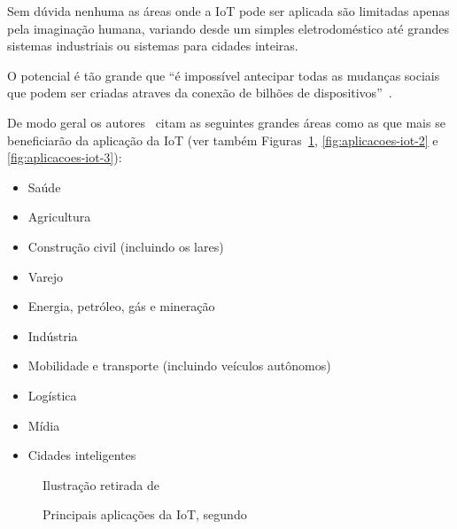 \documentclass[pdftex, brazil, 12pt, twoside]{article}
\begin{document}
Sem dúvida nenhuma as áreas onde a IoT pode ser aplicada são limitadas apenas
pela imaginação humana, variando desde um simples eletrodoméstico até grandes
sistemas industriais ou sistemas para cidades inteiras.

O potencial é tão grande que ``é impossível antecipar
todas as mudanças sociais que podem ser criadas atraves da conexão de bilhões
de dispositivos''~\citep{UKGOSWalportIoT2014}.

De modo geral os autores~\citep{OliverWymanIoT2015,UKGOSWalportIoT2014,IEEEIoTReport,IEEEIoTDefinition,ChuiIoT2010,BughinExecutiveIoT2015,GuptaMcKinseyIoT2017,McKinseyIoTHype,SAPFutureIoT,SASIoTUseCases2016} citam as seguintes grandes
áreas como as que mais se beneficiarão da aplicação da IoT (ver também
Figuras~\ref{fig:aplicacoes-iot-1}, \ref{fig:aplicacoes-iot-2} e \ref{fig:aplicacoes-iot-3}):

\begin{itemize}[noitemsep]
\item Saúde
\item Agricultura
\item Construção civil (incluindo os lares)
\item Varejo
\item Energia, petróleo, gás e mineração
\item Indústria
\item Mobilidade e transporte (incluindo veículos autônomos)
\item Logística
\item Mídia
\item Cidades inteligentes
\end{itemize}

\begin{figure}[!h]
  \begin{center}
    \caption{Principais aplicações da IoT, segundo~\citet{OliverWymanIoT2015}}
    \label{fig:aplicacoes-iot-1}
    
    \footnotesize{Ilustração retirada de~\citet{OliverWymanIoT2015}}
  \end{center}
\end{figure}
\end{document}
